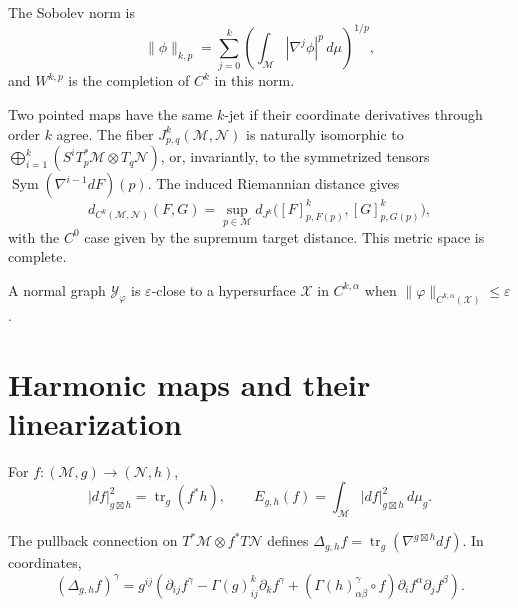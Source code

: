 \begin{definition}
\label{def:chow-iv-k8-sobolev-spaces}


The Sobolev norm is
\[
\|\phi\|_{k,p}=\sum_{j=0}^k\left(\int_{\mathcal M}|\nabla^j\phi|^p\,d\mu\right)^{1/p},
\]
and $W^{k,p}$ is the completion of $C^k$ in this norm.
\end{definition}

Two pointed maps have the same $k$-jet if their coordinate derivatives through
order $k$ agree.  The fiber $J^k_{p,q}(\mathcal M,\mathcal N)$ is naturally
isomorphic to $\bigoplus_{i=1}^k(S^iT_p^*\mathcal M\otimes T_q\mathcal N)$,
or, invariantly, to the symmetrized tensors
$\operatorname{Sym}(\nabla^{i-1}dF)(p)$.  The induced Riemannian distance gives
\[
d_{C^k(\mathcal M,\mathcal N)}(F,G)=
\sup_{p\in\mathcal M}d_{J^k}\bigl([F]^k_{p,F(p)},[G]^k_{p,G(p)}\bigr),
\]
with the $C^0$ case given by the supremum target distance.  This metric space
is complete.

\begin{definition}
\label{def:chow-iv-k9-hypersurface-closeness}


A normal graph $\mathcal Y_\varphi$ is $\varepsilon$-close to a hypersurface
$\mathcal X$ in $C^{k,\alpha}$ when
$\|\varphi\|_{C^{k,\alpha}(\mathcal X)}\le\varepsilon$.
\end{definition}

\section{Harmonic maps and their linearization}

\begin{definition}
\label{def:chow-iv-k10-map-energy}

For $f:(\mathcal M,g)\to(\mathcal N,h)$,
\[
|df|^2_{g\boxtimes h}=\operatorname{tr}_g(f^*h),\qquad
E_{g,h}(f)=\int_{\mathcal M}|df|^2_{g\boxtimes h}\,d\mu_g.
\]
\end{definition}

\begin{lemma}
\label{lem:chow-iv-k11-map-laplacian-coordinates}


The pullback connection on $T^*\mathcal M\otimes f^*T\mathcal N$ defines
$\Delta_{g,h}f=\operatorname{tr}_g(\nabla^{g\boxtimes h}df)$.  In coordinates,
\[
(\Delta_{g,h}f)^\gamma=g^{ij}\left(\partial_{ij}f^\gamma-
\Gamma(g)^k_{ij}\partial_kf^\gamma+
(\Gamma(h)^\gamma_{\alpha\beta}\circ f)\partial_if^\alpha\partial_jf^\beta\right).
\]
\end{lemma}

